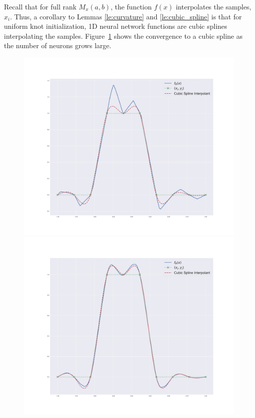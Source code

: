 Recall that for full rank $M_x(a,b)$, the function $f(x)$ interpolates the samples, $x_i$. Thus, a corollary to Lemmas \ref{le:curvature} and \ref{le:cubic_spline} is that for uniform knot initialization, 1D neural network functions are cubic splines interpolating the samples. Figure~\ref{fig:cubic_splines} shows the convergence to a cubic spline as the number of neurons grows large.  

\begin{figure}\label{fig:cubic_splines}
    \centering
    \includegraphics[width=\linewidth]{figures/cubic_spline100.pdf}
    \endminipage\hfill
    \includegraphics[width=\linewidth]{figures/cubic_spline_1k.pdf}

\end{figure}
